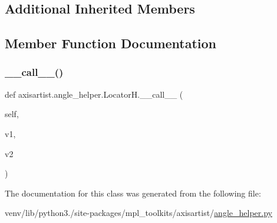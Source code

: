 \subsection*{Additional Inherited Members}


\subsection{Member Function Documentation}
\mbox{\label{classaxisartist_1_1angle__helper_1_1LocatorH_a543796c38ffe2a59811212c3b5c29151}} 
\subsubsection{\texorpdfstring{\+\_\+\+\_\+call\+\_\+\+\_\+()}{\_\_call\_\_()}}
{\footnotesize\ttfamily def axisartist.\+angle\+\_\+helper.\+Locator\+H.\+\_\+\+\_\+call\+\_\+\+\_\+ (\begin{DoxyParamCaption}\item[{}]{self,  }\item[{}]{v1,  }\item[{}]{v2 }\end{DoxyParamCaption})}



The documentation for this class was generated from the following file\+:\begin{DoxyCompactItemize}
\item 
venv/lib/python3./site-\/packages/mpl\+\_\+toolkits/axisartist/\hyperlink{axisartist_2angle__helper_8py}{angle\+\_\+helper.\+py}\end{DoxyCompactItemize}
